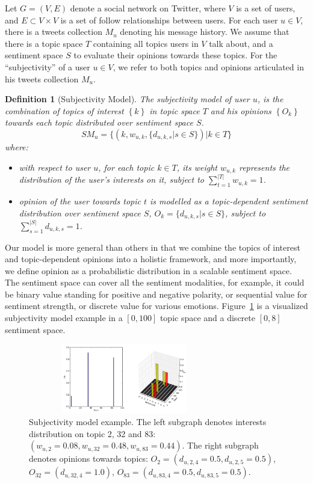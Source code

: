 \documentclass[letterpaper]{article}
\newtheorem{definition}{Definition}
\begin{document}
Let $G=\left( V,E \right) $ denote a social network on Twitter, where $ V $ is a set of users, and $ E\subset V\times V $ is a set of follow relationships between users. For each user $ u \in V $, there is a tweets collection $ M_{u} $ denoting his message history. We assume that there is a topic space $ T $ containing all topics users in $ V $ talk about, and a sentiment space $ S $ to evaluate their opinions towards these topics. 
For the ``subjectivity'' of a user $ u  \in V $, we refer to both topics and opinions articulated in his tweets collection $ M_{u} $.  
\begin{definition}[Subjectivity Model]
The subjectivity model of user $ u $, is the combination of topics of interest $\left\lbrace  k \right\rbrace $ in topic space $T$ and his opinions $\left\lbrace O_{k}\right\rbrace $ towards each topic distributed over sentiment space $ S $. 
\begin{equation}
\label{usermodel}
SM_{u}  = \lbrace \left( k, w_{u,k} , \lbrace d_{u,k,s} |s \in S \rbrace \right) |  k \in T \rbrace
\end{equation}
where:
\begin{itemize}
\item with respect to user $ u $, for each topic $k \in T$, its weight $ w_{u,k} $ represents the distribution of the user's interests on it, subject to $ \sum_{t=1}^{|T|}w_{u,k} =1 $.
\item opinion of the user towards topic $t$ is modelled as a topic-dependent sentiment distribution over sentiment space $ S $, $O_{k}=\lbrace d_{u,k,s}|s \in S \rbrace $, subject to $ \sum_{s=1}^{|S|} d_{u,k,s}=1$.
\end{itemize}
\end{definition}
Our model is more general than others in that we combine the topics of interest and topic-dependent opinions into a holistic framework, and more importantly, we define opinion as a probabilistic distribution in a scalable sentiment space. The sentiment space can cover all the sentiment modalities, for example, it could be binary value standing for positive and negative polarity, or sequential value for sentiment strength, or discrete value for various emotions. 
Figure~\ref{fig0} is a visualized subjectivity model example in a $ [0,100] $ topic space and a discrete $ [0,8] $ sentiment space. 
\begin{figure}[t]
\includegraphics[width=3.3in,height=1.2in]{fig1.pdf}
\caption{Subjectivity model example. The left subgraph denotes interests distribution on topic 2, 32 and 83: $ (  w_{u,2}=0.08,w_{u,32}=0.48, w_{u,83}=0.44)  $. The right subgraph denotes opinions towards topics: $ O_{2}=( d_{u,2,4} =0.5, d_{u,2,5} =0.5)$, $O_{32}=(d_{u,32,4}=1.0) $, $ O_{83}=( d_{u,83,4}=0.5, d_{u,83,5}=0.5 ) $.}
\label{fig0}
\end{figure}
\end{document}
